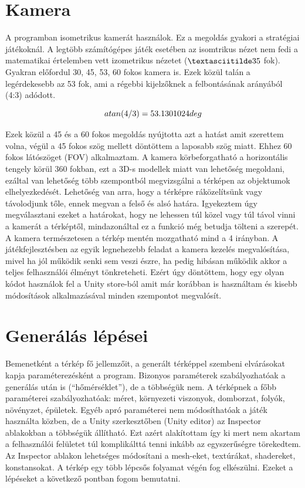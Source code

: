 \section{Kamera}

A programban isometrikus kamerát használok. Ez a megoldás gyakori a stratégiai játékoknál. A legtöbb számítógépes játék esetében az isomtrikus nézet nem fedi a matematikai értelemben vett izometrikus nézetet ($\textasciitilde 35$ fok). Gyakran előfordul 30, 45, 53, 60 fokos kamera is. Ezek közül talán a legérdekesebb az 53 fok, ami a régebbi kijelzőknek a felbontásának arányából (4:3) adódott. 

$$
atan(4 / 3) = 53.1301024 \space deg
$$

Ezek közül a 45 és a 60 fokos megoldás nyújtotta azt a hatást amit szerettem volna, végül a 45 fokos szög mellett döntöttem a laposabb szög miatt. Ehhez 60 fokos látószöget (FOV) alkalmaztam. A kamera körbeforgatható a horizontális tengely körül 360 fokban, ezt a 3D-s modellek miatt van lehetőség megoldani, ezáltal van lehetőség több szempontból megvizsgálni a térképen az objektumok elhelyezkedését. Lehetőség van arra, hogy a térképre ráközelítsünk vagy távolodjunk tőle, ennek megvan a felső és alsó határa. Igyekeztem úgy megválasztani ezeket a határokat, hogy ne lehessen túl közel vagy túl távol vinni a kamerát a térképtől, mindazonáltal ez a funkció még betudja tölteni a szerepét. A kamera természetesen a térkép mentén mozgatható mind a 4 irányban. 
\newline
\newline A játékfejlesztésben az egyik legnehezebb feladat a kamera kezelés megvalósítása, mivel ha jól működik senki sem veszi észre, ha pedig hibásan működik akkor a teljes felhasználói élményt tönkreteheti. Ezért úgy döntöttem, hogy egy olyan kódot használok fel a Unity store-ból amit már korábban is használtam és kisebb módosítások alkalmazásával minden szempontot megvalósít.

\section{Generálás lépései}

Bemenetként a térkép fő jellemzőit, a generált térképpel szembeni elvárásokat kapja paraméterezésként a program. Bizonyos paraméterek szabályozhatóak a generálás után is (“hőmérséklet”), de a többségük nem. A térképnek a főbb paraméterei szabályozhatóak: méret, környezeti viszonyok, domborzat, folyók, növényzet, épületek. Egyéb apró paraméterei nem módosíthatóak a játék használta közben, de a Unity szerkesztőben (Unity editor) az Inspector ablakokban a többségük állítható. Ezt azért alakítottam így ki mert nem akartam a felhasználói felületet túl komplikálttá tenni inkább az egyszerűségre törekedtem. Az Inspector ablakon lehetséges módosítani a mesh-eket, textúrákat, shadereket, konstansokat.
\newline
\newline A térkép egy több lépcsős folyamat végén fog elkészülni. Ezeket a lépéseket a következő pontban fogom bemutatni.

